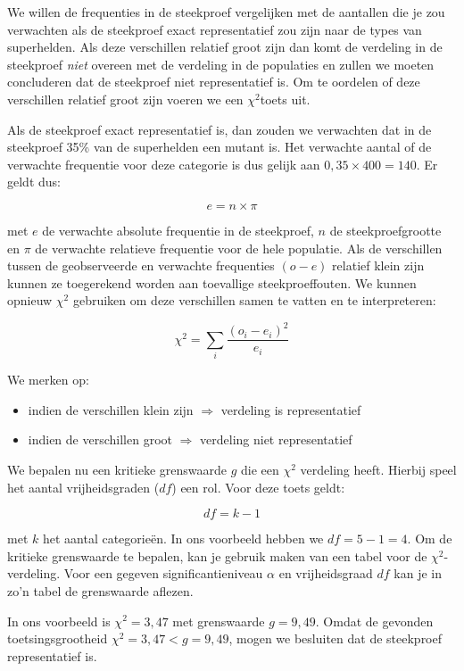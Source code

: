 We willen de frequenties in de steekproef vergelijken met de aantallen die je zou verwachten als de steekproef exact representatief zou zijn naar de types van superhelden. Als deze verschillen relatief groot zijn dan komt de verdeling in de steekproef \emph{niet} overeen met de verdeling in de populaties en zullen we moeten concluderen dat de steekproef niet representatief is. Om te oordelen of deze verschillen relatief groot zijn voeren we een $\chi^{2}$toets uit.

Als de steekproef exact representatief is, dan zouden we verwachten dat in de steekproef 35\% van de superhelden een mutant is. Het verwachte aantal of de verwachte frequentie voor deze categorie is dus gelijk aan $0,35 \times 400 = 140$. Er geldt dus:

\[ e = n \times \pi \]

met $e$ de verwachte absolute frequentie in de steekproef, $n$ de steekproefgrootte en $\pi$ de verwachte relatieve frequentie voor de hele populatie. Als de verschillen tussen de geobserveerde en verwachte frequenties $(o - e)$ relatief klein zijn kunnen ze toegerekend worden aan toevallige steekproeffouten. We kunnen opnieuw $\chi^2$ gebruiken om deze verschillen samen te vatten en te interpreteren:

\[ \chi^{2} = \sum_i \frac{(o_{i} - e_{i})^{2}}{e_{i}} \]

We merken op:

\begin{itemize}
  \item indien de verschillen klein zijn $\Rightarrow$ verdeling is representatief
  \item indien de verschillen groot $\Rightarrow$ verdeling niet representatief
\end{itemize}

We bepalen nu een kritieke grenswaarde $g$ die een $\chi^{2}$ verdeling heeft. Hierbij speel het aantal vrijheidsgraden ($df$) een rol. Voor deze toets geldt:

\[ df = k - 1 \]

met $k$ het aantal categorie\"en. In ons voorbeeld hebben we $df = 5-1 = 4$. Om de kritieke grenswaarde te bepalen, kan je gebruik maken van een tabel voor de $\chi^2$-verdeling. Voor een gegeven significantieniveau $\alpha$ en vrijheidsgraad $df$ kan je in zo'n tabel de grenswaarde aflezen.

In ons voorbeeld is $\chi^{2} = 3,47$ met grenswaarde $g = 9,49$. Omdat de gevonden toetsingsgrootheid $\chi^2 = 3,47 < g = 9,49$, mogen we besluiten dat de steekproef representatief is.

